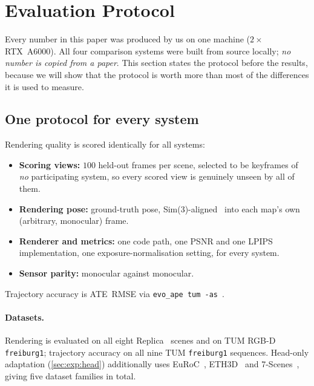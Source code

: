 \section{Evaluation Protocol}
\label{sec:protocol}

Every number in this paper was produced by us on one machine
($2{\times}$RTX~A6000). All four comparison systems were built from source
locally; \emph{no number is copied from a paper}. This section states the
protocol before the results, because we will show that the protocol is worth
more than most of the differences it is used to measure.

\subsection{One protocol for every system}
Rendering quality is scored identically for all systems:
\begin{itemize}\itemsep2pt
\item \textbf{Scoring views:} $100$ held-out frames per scene, selected to be
      keyframes of \emph{no} participating system, so every scored view is
      genuinely unseen by all of them.
\item \textbf{Rendering pose:} ground-truth pose, Sim(3)-aligned~\cite{umeyama1991}
      into each map's own (arbitrary, monocular) frame.
\item \textbf{Renderer and metrics:} one code path, one PSNR and one
      LPIPS~\cite{zhang2018lpips} implementation, one exposure-normalisation
      setting, for every system.
\item \textbf{Sensor parity:} monocular against monocular.
\end{itemize}
Trajectory accuracy is ATE~RMSE via \texttt{evo\_ape tum -as}~\cite{grupp2017evo}.

\paragraph{Datasets.} Rendering is evaluated on all eight
Replica~\cite{straub2019replica} scenes and on TUM
RGB-D~\cite{sturm2012tum} \texttt{freiburg1}; trajectory accuracy on all nine
TUM \texttt{freiburg1} sequences. Head-only adaptation
(\cref{sec:exp:head}) additionally uses EuRoC~\cite{burri2016euroc},
ETH3D~\cite{schops2017eth3d} and 7-Scenes~\cite{shotton2013scenecoord},
giving five dataset families in total.

